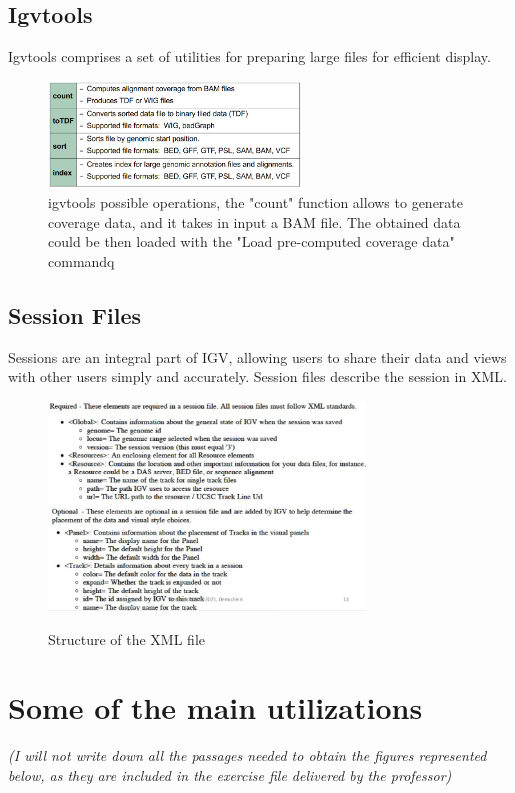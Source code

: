 \subsection{Igvtools}
Igvtools comprises a set of utilities for preparing large files for efficient display.

\begin{figure}[H]
    \caption{igvtools possible operations, the "count" function allows to generate coverage data, and it takes in input a BAM file. The obtained data could be then loaded with the "Load pre-computed coverage data" commandq}
    \centering
    \includegraphics[width=0.6\textwidth]{igvtools.PNG}
\end{figure}

\subsection{Session Files}
Sessions are an integral part of IGV, allowing users to share their data and
views with other users simply and accurately. Session files describe the session
in XML.

\begin{figure}[H]
    \caption{Structure of the XML file}
    \centering
    \includegraphics[width=0.75\textwidth]{structureXMLfile.PNG}
    \label{XMLfile}
\end{figure} 



\section{Some of the main utilizations}
\textit{(I will not write down all the passages needed to obtain the figures represented
below, as they are included in the exercise file delivered by the professor)}

